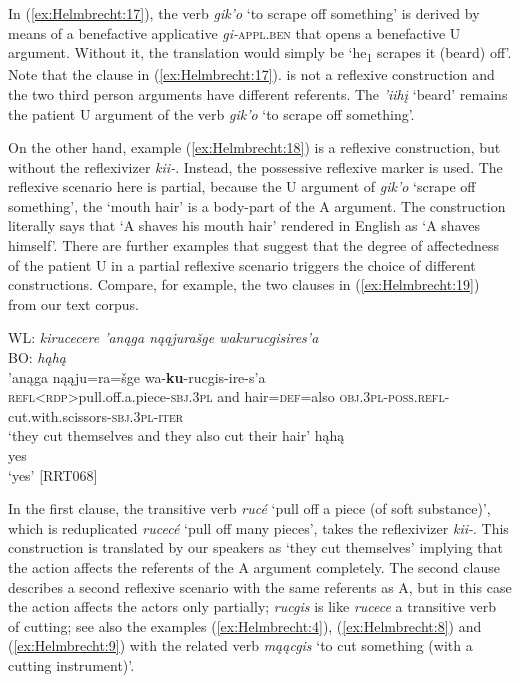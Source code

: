 \documentclass[output=paper]{langscibook}
\begin{document}
In (\ref{ex:Helmbrecht:17}), the verb \textit{gik'o} `to scrape off something' is derived by means of a benefactive applicative \textit{gi-}\textsc{appl.ben} that opens a benefactive U argument. Without it, the translation would simply be `he\textsubscript{1} scrapes it (beard) off'. Note that the clause in (\ref{ex:Helmbrecht:17}). is not a reflexive construction and the two third person arguments have different referents. The \textit{{}'iihį} `beard' remains the patient U argument of the verb \textit{gik'o} `to scrape off something'.

On the other hand, example (\ref{ex:Helmbrecht:18}) is a reflexive construction, but without the reflexivizer \textit{kii-}. Instead, the possessive reflexive marker is used. The reflexive scenario here is partial, because the U argument of \textit{gik'o} `scrape off something', the `mouth hair' is a body-part of the A argument. The construction literally says that `A shaves his mouth hair' rendered in English as `A shaves himself'. There are further examples that suggest that the degree of affectedness of the patient U in a partial reflexive scenario triggers the choice of different constructions. Compare, for example, the two clauses in (\ref{ex:Helmbrecht:19}) from our text corpus.


\ea \label{ex:Helmbrecht:19}
  WL:  \textit{kirucecere 'anąga nąąjurašge wakurucgisires'a}\\
  BO: \textit{ hąhą }\\
  \ea 
      {'anąga}   {nąąju=ra=šge}  {wa-\textbf{ku}-rucgis-ire-s'a}\\
  {\textsc{\textsc{refl}}<\textsc{rdp}>pull.off.a.piece-\textsc{sbj.3\textsc{pl}}}  {and}  {hair=\textsc{def}=also}   {\textsc{obj.3\textsc{pl}}-\textsc{poss.\textsc{refl}}-cut.with.scissors-\textsc{sbj.3{pl}-iter}}\\
  \glt `they cut themselves and they also cut their hair'
  \ex 
    {hąhą}\\
  {}  {yes}\\   
  	\glt `yes'  [RRT068]
  	\z 
\z 

In the first clause, the transitive verb \textit{rucé} `pull off a piece (of soft substance)', which is reduplicated \textit{rucecé} `pull off many pieces', takes the reflexivizer \textit{kii-}. This construction is translated by our speakers as `they cut themselves' implying that the action affects the referents of the A argument completely. The second clause describes a second reflexive scenario with the same referents as A, but in this case the action affects the actors only partially; \textit{rucgis} is like \textit{rucece} a transitive verb of cutting; see also the examples (\ref{ex:Helmbrecht:4}), (\ref{ex:Helmbrecht:8}) and (\ref{ex:Helmbrecht:9}) with the related verb \textit{mąącgis} `to cut something (with a cutting instrument)'.
\end{document}
